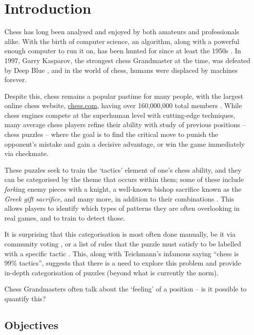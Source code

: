 \chapter{Introduction}\label{introductionChapter}

Chess has long been analysed and enjoyed by both amateurs and professionals
alike. With the birth of computer science, an algorithm, along with a powerful
enough computer to run it on, has been hunted for since at least the 1950s
\citep{shannon}. In 1997, Garry Kasparov, the strongest chess Grandmaster at
the time, was defeated by Deep Blue \citep{deepBlue}, and in the world of
chess, humans were displaced by machines forever. 

Despite this, chess remains a popular pastime for many people, with the largest
online chess website, \url{chess.com}, having over 160,000,000 total members
\citep{chesscomMembers}. While chess engines compete at the superhuman level
with cutting-edge techniques, many average chess players refine their ability
with study of previous positions -- chess puzzles -- where the goal is to find
the critical move to punish the opponent's mistake and gain a decisive
advantage, or win the game immediately via checkmate. 

These puzzles seek to train the `tactics' element of one's chess ability, and
they can be categorised by the theme that occurs within them; some of these
include \emph{fork}ing enemy pieces with a knight, a well-known bishop
sacrifice known as the \emph{Greek gift sacrifice}, and many more, in addition
to their combinations \citep{chessPatterns}. This allows players to identify
which types of patterns they are often overlooking in real games, and to train
to detect those. 

It is surprising that this categorisation is most often done manually, be it
via community voting \citep{lichessPuzzles}, or a list of rules that the puzzle
must satisfy to be labelled with a specific tactic \citep{lichessTagger}. This,
along with Teichmann's infamous saying ``chess is 99\% tactics'', suggests that
there is a need to explore this problem and provide in-depth categorisation of
puzzles (beyond what is currently the norm).

Chess Grandmasters often talk about the `feeling' of a position -- is it
possible to quantify this?

\section{Objectives}

